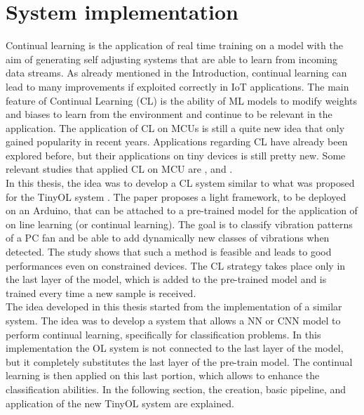 \documentclass[12pt]{report}
\begin{document}
\chapter{System implementation}
Continual learning is the application of real time training on a model with the aim of generating self adjusting systems that are able to learn from incoming data streams. As already mentioned in the Introduction, continual learning can lead to many improvements if exploited correctly in IoT applications. The main feature of Continual Learning (CL) is the ability of ML models to modify weights and biases to learn from the environment and continue to be relevant in the application. The application of CL on MCUs is still a quite new idea that only gained popularity in recent years. Applications regarding CL have already been explored before, but their applications on tiny devices is still pretty new. Some relevant studies that applied CL on MCU are \autocite{ren2021tinyol}, \autocite{ren2021synergy} and \autocite{sudharsan2021train++}. \\
In this thesis, the idea was to develop a CL system similar to what was proposed for the TinyOL system \autocite{ren2021tinyol}. The paper proposes a light framework, to be deployed on an Arduino, that can be attached to a pre-trained model for the application of on line learning (or continual learning). The goal is to classify vibration patterns of a PC fan and be able to add dynamically new classes of vibrations when detected. The study shows that such a method is feasible and leads to good performances even on constrained devices. The CL strategy takes place only in the last layer of the model, which is added to the pre-trained model and is trained every time a new sample is received.\\
The idea developed in this thesis started from the implementation of a similar system. The idea was to develop a system that allows a NN or CNN model to perform continual learning, specifically for classification problems. In this implementation the OL system is not connected to the last layer of the model, but it completely substitutes the last layer of the pre-train model. The continual learning is then applied on this last portion, which allows to enhance the classification abilities. In the following section, the creation, basic pipeline, and application of the new TinyOL system are explained. 
\end{document}

